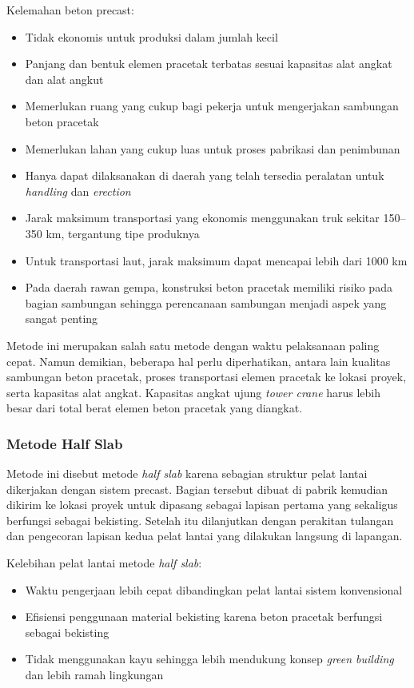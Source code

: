 \documentclass[../modul_skb.tex]{subfiles}
\begin{document}
Kelemahan beton precast:

\begin{itemize}
	\item Tidak ekonomis untuk produksi dalam jumlah kecil
	\item Panjang dan bentuk elemen pracetak terbatas sesuai kapasitas alat angkat dan alat angkut
	\item Memerlukan ruang yang cukup bagi pekerja untuk mengerjakan sambungan beton pracetak
	\item Memerlukan lahan yang cukup luas untuk proses pabrikasi dan penimbunan
	\item Hanya dapat dilaksanakan di daerah yang telah tersedia peralatan untuk \textit{handling} dan \textit{erection}
	\item Jarak maksimum transportasi yang ekonomis menggunakan truk sekitar 150–350 km, tergantung tipe produknya
	\item Untuk transportasi laut, jarak maksimum dapat mencapai lebih dari 1000 km
	\item Pada daerah rawan gempa, konstruksi beton pracetak memiliki risiko pada bagian sambungan sehingga perencanaan sambungan menjadi aspek yang sangat penting
\end{itemize}

Metode ini merupakan salah satu metode dengan waktu pelaksanaan paling cepat. Namun demikian, beberapa hal perlu diperhatikan, antara lain kualitas sambungan beton pracetak, proses transportasi elemen pracetak ke lokasi proyek, serta kapasitas alat angkat. Kapasitas angkat ujung \textit{tower crane} harus lebih besar dari total berat elemen beton pracetak yang diangkat.


\subsubsection{Metode Half Slab}

Metode ini disebut metode \textit{half slab} karena sebagian struktur pelat lantai dikerjakan dengan sistem precast. Bagian tersebut dibuat di pabrik kemudian dikirim ke lokasi proyek untuk dipasang sebagai lapisan pertama yang sekaligus berfungsi sebagai bekisting. Setelah itu dilanjutkan dengan perakitan tulangan dan pengecoran lapisan kedua pelat lantai yang dilakukan langsung di lapangan.

Kelebihan pelat lantai metode \textit{half slab}:

\begin{itemize}
	\item Waktu pengerjaan lebih cepat dibandingkan pelat lantai sistem konvensional
	\item Efisiensi penggunaan material bekisting karena beton pracetak berfungsi sebagai bekisting
	\item Tidak menggunakan kayu sehingga lebih mendukung konsep \textit{green building} dan lebih ramah lingkungan
\end{itemize}
\end{document}

